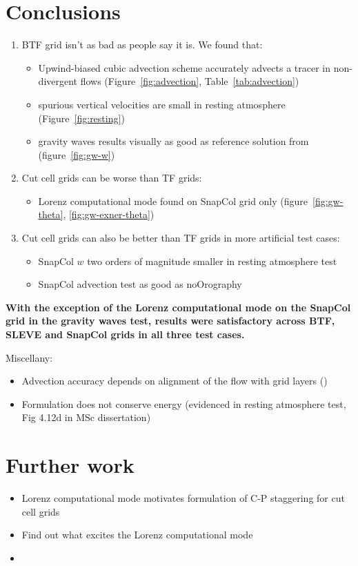 \documentclass[a4paper]{article}
\begin{document}
\section{Conclusions}
\begin{enumerate}
	\item BTF grid isn't as bad as people say it is.  We found that:
	\begin{itemize}
		\item Upwind-biased cubic advection scheme accurately advects a tracer in non-divergent flows (Figure~\ref{fig:advection}, Table~\ref{tab:advection})
		\item spurious vertical velocities are small in resting atmosphere (Figure~\ref{fig:resting})
		\item gravity waves results visually as good as reference solution from \textcite{melvin2010} (figure~\ref{fig:gw-w})
	\end{itemize}

	\item Cut cell grids can be worse than TF grids:
	\begin{itemize}
		\item Lorenz computational mode found on SnapCol grid only (figure~\ref{fig:gw-theta}, \ref{fig:gw-exner-theta})
	\end{itemize}

	\item Cut cell grids can also be better than TF grids in more artificial test cases:
	\begin{itemize}
		\item SnapCol $w$ two orders of magnitude smaller in resting atmosphere test
		\item SnapCol advection test as good as noOrography
	\end{itemize}
\end{enumerate}

\textbf{With the exception of the Lorenz computational mode on the SnapCol grid in the gravity waves test, results were satisfactory across BTF, SLEVE and SnapCol grids in all three test cases.}

Miscellany:
\begin{itemize}
	\item Advection accuracy depends on alignment of the flow with grid layers ()
	\item Formulation does not conserve energy (evidenced in resting atmosphere test, Fig 4.12d in MSc dissertation)
\end{itemize}

\section{Further work}
\begin{itemize}
	\item Lorenz computational mode motivates formulation of C-P staggering for cut cell grids
	\item Find out what excites the Lorenz computational mode
	\item {}
\end{itemize}
\end{document}

